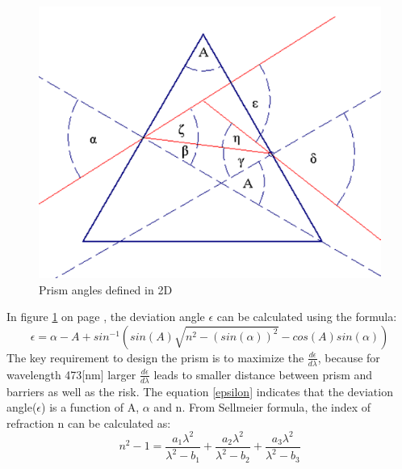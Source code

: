 \begin{figure}[ht!]
\centering
\includegraphics[scale = 0.6]{chapters/img/Prism2D.png}
\caption{Prism angles defined in 2D}
\label{fig:prism2D}
\end{figure} 
In figure \ref{fig:prism2D} on page \pageref{fig:prism2D}, the deviation angle $\epsilon$ can be calculated using the formula\cite{prism_angle_calculation}:
\begin{equation}
\label{epsilon}
\epsilon = \alpha - A + sin^{-1}(sin(A)\sqrt{n^2 - (sin(\alpha))^2} - cos(A)sin(\alpha))
\end {equation}
The key requirement to design the prism is to maximize the $\frac{d\epsilon}{d\lambda}$,  because for wavelength 473[nm] larger $\frac{d\epsilon}{d\lambda}$ leads to smaller distance between prism and barriers as well as the risk. The equation \ref{epsilon} indicates that the deviation angle($\epsilon$) is a function of A, $\alpha$ and n. From Sellmeier formula\cite{prism_book}, the index of refraction n can be calculated as:
\begin{equation}
\label{index_refraction}
n^2 - 1 = \frac{a_{1}\lambda^2}{\lambda^2-b_{1}} + \frac{a_{2}\lambda^2}{\lambda^2-b_{2}} + \frac{a_{3}\lambda^2}{\lambda^2-b_{3}}
\end {equation}
